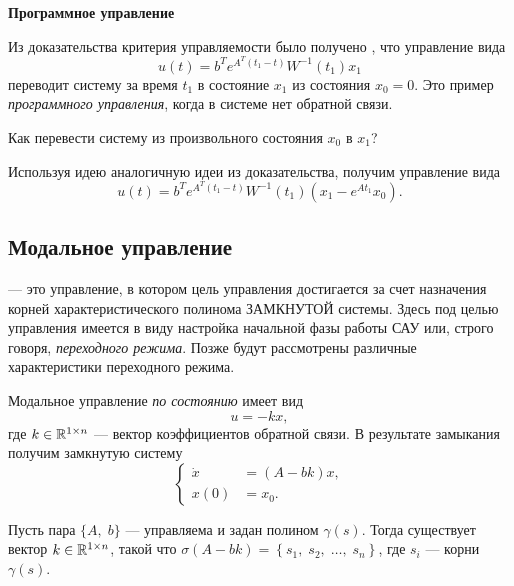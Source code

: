 \documentclass[../../TAU.tex]{subfiles}
\begin{document}
    \proof \cite[стр. 308-311]{voron2}
    \par
    \textbf{Программное управление}
    \par
    Из доказательства критерия управляемости было получено \cite[стр. 311]{voron2}, что управление вида
    $$
        u(t) = b^Te^{A^T(t_1-t)}W^{-1}(t_1)x_1
    $$
    переводит систему за время $t_1$ в состояние $x_1$ из состояния $x_0 = 0$. Это пример {\it программного управления}, когда в системе нет обратной связи.

    Как перевести систему из произвольного состояния $x_0$ в $x_1$?

    Используя идею аналогичную идеи из доказательства, получим управление вида
    $$
        u(t) = b^Te^{A^T(t_1-t)}W^{-1}(t_1)(x_1 - e^{At_1}x_0).
    $$

\subsection{Модальное управление}

     --- это управление, в котором цель управления достигается за счет назначения корней характеристического полинома ЗАМКНУТОЙ системы. Здесь под целью управления имеется в виду настройка начальной фазы работы САУ или, строго говоря, {\it переходного режима}. Позже будут рассмотрены различные характеристики переходного режима.

    Модальное управление {\it по состоянию} имеет вид
    $$
        u = -kx,
    $$
    где $k\in\mathbb{R}^{1\times n}$ --- вектор коэффициентов обратной связи. В результате замыкания получим замкнутую систему
    $$
        \left\{
        \begin{aligned}
            \dot x &= (A - bk)x,\\
            x(0) &= x_0.
        \end{aligned}
        \right.
    $$

    \begin{theor} 
        Пусть пара $\{A,\; b\}$ --- управляема и задан полином $\gamma(s)$. Тогда существует вектор 
        $k\in\mathbb{R}^{1\times n}$, 
        такой что 
        $\sigma(A-bk) = \left\{s_1,\; s_2,\;\ldots,\; s_n\right\}$, где $s_i$ --- корни $\gamma(s)$.
    \end{theor}
\end{document}
